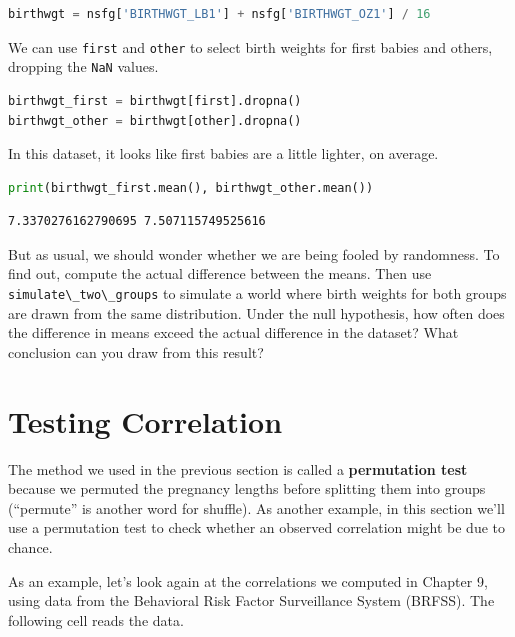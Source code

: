 \begin{lstlisting}[language=Python,style=source]
birthwgt = nsfg['BIRTHWGT_LB1'] + nsfg['BIRTHWGT_OZ1'] / 16
\end{lstlisting}

We can use \passthrough{\lstinline!first!} and
\passthrough{\lstinline!other!} to select birth weights for first babies
and others, dropping the \passthrough{\lstinline!NaN!} values.

\begin{lstlisting}[language=Python,style=source]
birthwgt_first = birthwgt[first].dropna()
birthwgt_other = birthwgt[other].dropna()
\end{lstlisting}

In this dataset, it looks like first babies are a little lighter, on
average.

\begin{lstlisting}[language=Python,style=source]
print(birthwgt_first.mean(), birthwgt_other.mean())
\end{lstlisting}

\begin{lstlisting}[style=output]
7.3370276162790695 7.507115749525616
\end{lstlisting}

But as usual, we should wonder whether we are being fooled by
randomness. To find out, compute the actual difference between the
means. Then use \passthrough{\lstinline!simulate\_two\_groups!} to
simulate a world where birth weights for both groups are drawn from the
same distribution. Under the null hypothesis, how often does the
difference in means exceed the actual difference in the dataset? What
conclusion can you draw from this result?

\section{Testing Correlation}\label{testing-correlation}

The method we used in the previous section is called a
\textbf{permutation test} because we permuted the pregnancy lengths
before splitting them into groups (``permute'' is another word for
shuffle). As another example, in this section we'll use a permutation
test to check whether an observed correlation might be due to chance.

As an example, let's look again at the correlations we computed in
Chapter 9, using data from the Behavioral Risk Factor Surveillance
System (BRFSS). The following cell reads the data.

